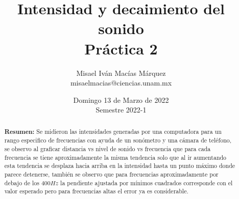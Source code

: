 \documentclass[DIV=calc, paper=a4, fontsize=11pt]{scrartcl}
\title{Intensidad y decaimiento del sonido\\ %
Práctica 2} %
\author{Misael Iván Macías Márquez\\
misaelmacias@ciencias.unam.mx}
\date{Domingo 13 de Marzo de 2022\\Semestre 2022-1}
\begin{document}
\maketitle


\begin{abstract}
\textbf{Resumen:} Se midieron las intensidades generadas por una computadora para un rango especifico de frecuencias con ayuda de un sonómetro y una cámara de teléfono, se observo al graficar distancia vs nivel de sonido vs frecuencia que para cada frecuencia se tiene aproximadamente la misma tendencia solo que al ir aumentando esta tendencia se desplaza hacia arriba en la intensidad hasta un punto máximo donde parece detenerse, también se observo que para frecuencias aproximadamente por debajo de los $400Hz$ la pendiente ajustada por mínimos cuadrados corresponde con el valor esperado  pero para frecuencias altas el error ya es considerable.


\end{abstract}
\end{document}
